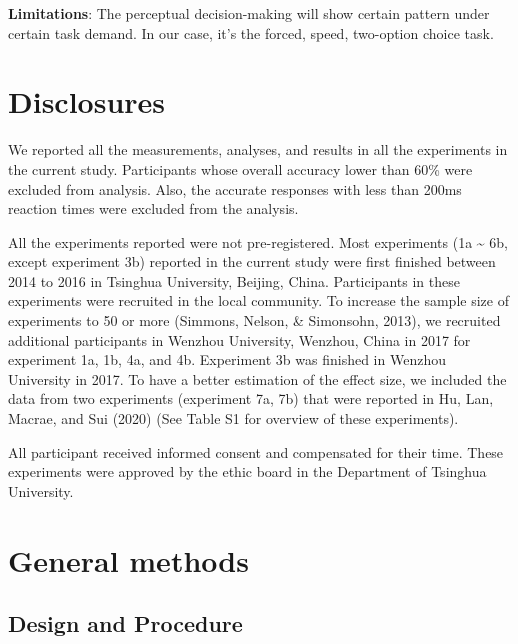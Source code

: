 \documentclass[
  english,
  man]{apa6}
\begin{document}
\textbf{Limitations}:
The perceptual decision-making will show certain pattern under certain task demand. In our case, it's the forced, speed, two-option choice task.

\hypertarget{disclosures}{%
\section{Disclosures}\label{disclosures}}

We reported all the measurements, analyses, and results in all the experiments in the current study. Participants whose overall accuracy lower than 60\% were excluded from analysis. Also, the accurate responses with less than 200ms reaction times were excluded from the analysis.

All the experiments reported were not pre-registered. Most experiments (1a \textasciitilde{} 6b, except experiment 3b) reported in the current study were first finished between 2014 to 2016 in Tsinghua University, Beijing, China. Participants in these experiments were recruited in the local community. To increase the sample size of experiments to 50 or more (Simmons, Nelson, \& Simonsohn, 2013), we recruited additional participants in Wenzhou University, Wenzhou, China in 2017 for experiment 1a, 1b, 4a, and 4b. Experiment 3b was finished in Wenzhou University in 2017. To have a better estimation of the effect size, we included the data from two experiments (experiment 7a, 7b) that were reported in Hu, Lan, Macrae, and Sui (2020) (See Table S1 for overview of these experiments).

All participant received informed consent and compensated for their time. These experiments were approved by the ethic board in the Department of Tsinghua University.

\hypertarget{general-methods}{%
\section{General methods}\label{general-methods}}

\hypertarget{design-and-procedure}{%
\subsection{Design and Procedure}\label{design-and-procedure}}
\end{document}
